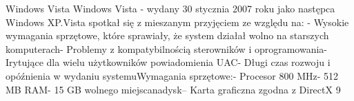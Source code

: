 \begin{frame}{Windows Vista}
Windows Vista - wydany 30 stycznia 2007 roku jako następca Windows XP.Vista spotkał się z mieszanym przyjęciem ze względu na:
- Wysokie wymagania sprzętowe, które sprawiały, że system działał wolno na starszych komputerach- Problemy z kompatybilnością sterowników i oprogramowania- Irytujące dla wielu użytkowników powiadomienia UAC- Długi czas rozwoju i opóźnienia w wydaniu systemuWymagania sprzętowe:- Procesor 800 MHz- 512 MB RAM- 15 GB wolnego miejscanadysk-- Karta graficzna zgodna z DirectX 9



\end{frame}
